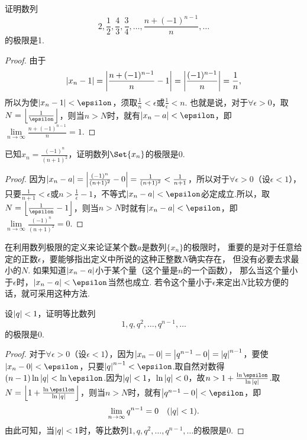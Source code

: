 \begin{example}
证明数列\[
2,\frac{1}{2},\frac{4}{3},\frac{3}{4},\dotsc,\frac{n+(-1)^{n-1}}{n},\dotsc
\]的极限是1.
\begin{proof}
由于\[
\abs{x_n - 1}
= \abs{\frac{n+(-1)^{n-1}}{n}-1}
= \abs{\frac{(-1)^{n-1}}{n}}
= \frac{1}{n},
\]所以为使\(\abs{x_n - 1} < \epsilon\)，须取\(\frac{1}{n} < \epsilon\)或\(\frac{1}{\epsilon} < n\).
也就是说，对于\(\forall \epsilon > 0\)，取\(N = \floor*{\frac{1}{\epsilon}}\)，则当\(n > N\)时，就有\(\abs{x_n - a} < \epsilon\)，即\(\lim\limits_{n\to\infty}\frac{n+(-1)^{n-1}}{n}=1\).
\end{proof}
\end{example}

\begin{example}
已知\(x_n = \frac{(-1)^n}{(n+1)^2}\)，证明数列\(\Set{x_n}\)的极限是\(0\).
\begin{proof}
因为\(\abs{x_n - a} = \abs{\frac{(-1)^n}{(n+1)^2}-0} = \frac{1}{(n+1)^2} < \frac{1}{n+1}\)，所以对于\(\forall\epsilon>0\)（设\(\epsilon<1\)），只要\(\frac{1}{n+1}<\epsilon\)或\(n>\frac{1}{\epsilon}-1\)，不等式\(\abs{x_n-a}<\epsilon\)必定成立.所以，取\(N=\floor*{\frac{1}{\epsilon}-1}\)，则当\(n>N\)时就有\(\abs{x_n - a}<\epsilon\)，即\(\lim\limits_{n\to\infty}\frac{(-1)^n}{(n+1)^2}=0\).
\end{proof}
\end{example}

在利用数列极限的定义来论证某个数\(a\)是数列\(\{x_n\}\)的极限时，
重要的是对于任意给定的正数\(\epsilon\)，要能够指出定义中所说的这种正整数\(N\)确实存在，
但没有必要去求最小的\(N\).
如果知道\(\abs{x_n-a}\)小于某个量（这个量是\(n\)的一个函数），
那么当这个量小于\(\epsilon\)时，\(\abs{x_n-a}<\epsilon\)当然也成立.
若令这个量小于\(\epsilon\)来定出\(N\)比较方便的话，就可采用这种方法.

\begin{example}
设\(\abs{q}<1\)，证明等比数列\[
1,q,q^2,\dotsc,q^{n-1},\dotsc
\]的极限是\(0\).
\begin{proof}
对于\(\forall\epsilon>0\)（设\(\epsilon<1\)），因为\(\abs{x_n-0}=\abs{q^{n-1}-0}=\abs{q}^{n-1}\)，要使\(\abs{x_n-0}<\epsilon\)，只要\(\abs{q}^{n-1}<\epsilon\).取自然对数得\((n-1)\ln\abs{q}<\ln\epsilon\).因为\(\abs{q}<1\)，\(\ln\abs{q}<0\)，故\(n>1+\frac{\ln\epsilon}{\ln\abs{q}}\).取\(N=\floor*{1+\frac{\ln\epsilon}{\ln\abs{q}}}\)，则当\(n>N\)时，就有\(\abs{q^{n-1}-0}<\epsilon\)，即
\begin{equation}
\lim\limits_{n\to\infty}q^{n-1}=0
\quad(\abs{q}<1).
\end{equation}
由此可知，当\(\abs{q}<1\)时，等比数列\(1,q,q^2,\dotsc,q^{n-1},\dotsc\)的极限是\(0\).
\end{proof}
\end{example}

